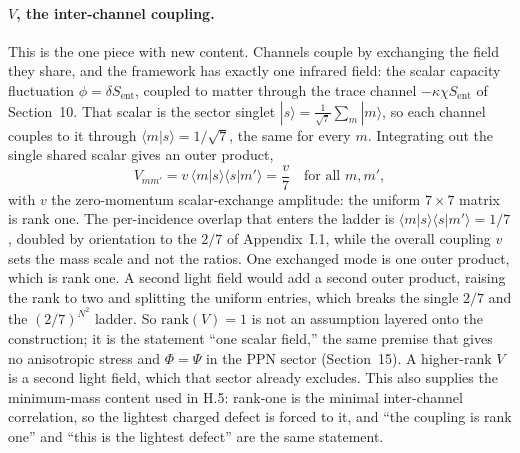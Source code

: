 \documentclass[11pt]{article}
\begin{document}
\paragraph{$V$, the inter-channel coupling.}
This is the one piece with new content. Channels couple by exchanging the field they share, and the framework has exactly one infrared field: the scalar capacity fluctuation $\phi=\delta S_{\mathrm{ent}}$, coupled to matter through the trace channel $-\kappa\chi S_{\mathrm{ent}}$ of Section~10. That scalar is the sector singlet $|s\rangle=\tfrac{1}{\sqrt7}\sum_m|m\rangle$, so each channel couples to it through $\langle m|s\rangle=1/\sqrt7$, the same for every $m$. Integrating out the single shared scalar gives an outer product,
\[
V_{mm'}=v\,\langle m|s\rangle\langle s|m'\rangle=\frac{v}{7}\quad\text{for all }m,m',
\]
with $v$ the zero-momentum scalar-exchange amplitude: the uniform $7\times7$ matrix is rank one. The per-incidence overlap that enters the ladder is $\langle m|s\rangle\langle s|m'\rangle=1/7$, doubled by orientation to the $2/7$ of Appendix~I.1, while the overall coupling $v$ sets the mass scale and not the ratios. One exchanged mode is one outer product, which is rank one. A second light field would add a second outer product, raising the rank to two and splitting the uniform entries, which breaks the single $2/7$ and the $(2/7)^{N^2}$ ladder. So $\mathrm{rank}(V)=1$ is not an assumption layered onto the construction; it is the statement ``one scalar field,'' the same premise that gives no anisotropic stress and $\Phi=\Psi$ in the PPN sector (Section~15). A higher-rank $V$ is a second light field, which that sector already excludes. This also supplies the minimum-mass content used in H.5: rank-one is the minimal inter-channel correlation, so the lightest charged defect is forced to it, and ``the coupling is rank one'' and ``this is the lightest defect'' are the same statement.
\end{document}
